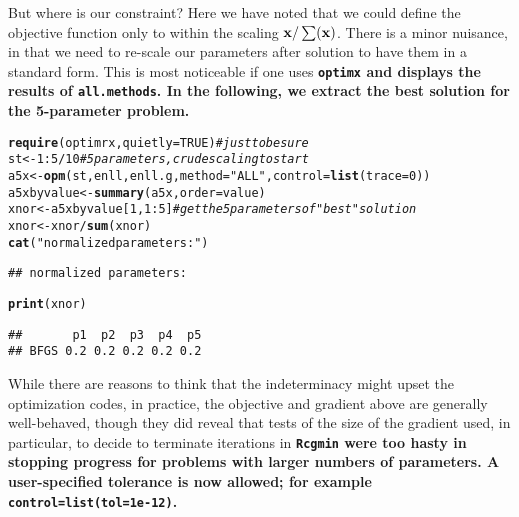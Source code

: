 \documentclass[11pt]{article}\usepackage[]{graphicx}\usepackage[]{color}
\makeatletter
\newcommand{\hlnum}[1]{\textcolor[rgb]{0.686,0.059,0.569}{#1}}%
\newcommand{\hlstr}[1]{\textcolor[rgb]{0.192,0.494,0.8}{#1}}%
\newcommand{\hlcom}[1]{\textcolor[rgb]{0.678,0.584,0.686}{\textit{#1}}}%
\newcommand{\hlopt}[1]{\textcolor[rgb]{0,0,0}{#1}}%
\newcommand{\hlstd}[1]{\textcolor[rgb]{0.345,0.345,0.345}{#1}}%
\newcommand{\hlkwb}[1]{\textcolor[rgb]{0.69,0.353,0.396}{#1}}%
\newcommand{\hlkwc}[1]{\textcolor[rgb]{0.333,0.667,0.333}{#1}}%
\newcommand{\hlkwd}[1]{\textcolor[rgb]{0.737,0.353,0.396}{\textbf{#1}}}%
\newenvironment{kframe}{%
 \def\at@end@of@kframe{}%
 \ifinner\ifhmode%
  \def\at@end@of@kframe{\end{minipage}}%
  \begin{minipage}{\columnwidth}%
 \fi\fi%
 \def\FrameCommand##1{\hskip\@totalleftmargin \hskip-\fboxsep
 \colorbox{shadecolor}{##1}\hskip-\fboxsep
     \hskip-\linewidth \hskip-\@totalleftmargin \hskip\columnwidth}%
 \MakeFramed {\advance\hsize-\width
   \@totalleftmargin\z@ \linewidth\hsize
   \@setminipage}}%
 {\par\unskip\endMakeFramed%
 \at@end@of@kframe}
\newenvironment{knitrout}{}{} %
\newcommand{\B}[1]{{\bf #1 \rm}}
\newcommand{\code}[1]{{\tt#1}}
\newcommand{\pkg}[1]{\bf{\tt#1}\rm }
\makeatother
\begin{document}
But where is our constraint? Here we have noted that we could define the objective 
function only to within the scaling  $\B{x}/\sum(\B{x})$. There is a minor 
nuisance, in that we need to re-scale our 
parameters after solution to have them in a standard form. 
This is most noticeable if one uses \pkg{optimx}
and displays the results of \code{all.methods}. In the following, we
extract the best solution for the 5-parameter problem.

\begin{knitrout}\scriptsize
{}\color{fgcolor}\begin{kframe}
\begin{alltt}
\hlkwd{require}\hlstd{(optimrx,} \hlkwc{quietly}\hlstd{=}\hlnum{TRUE}\hlstd{)} \hlcom{# just to be sure}
\hlstd{st}\hlkwb{<-}\hlnum{1}\hlopt{:}\hlnum{5}\hlopt{/}\hlnum{10} \hlcom{# 5 parameters, crude scaling to start}
\hlstd{a5x}\hlkwb{<-}\hlkwd{opm}\hlstd{(st, enll, enll.g,} \hlkwc{method}\hlstd{=}\hlstr{"ALL"}\hlstd{,} \hlkwc{control}\hlstd{=}\hlkwd{list}\hlstd{(}\hlkwc{trace}\hlstd{=}\hlnum{0}\hlstd{))}
\hlstd{a5xbyvalue}\hlkwb{<-}\hlkwd{summary}\hlstd{(a5x,} \hlkwc{order}\hlstd{=value)}
\hlstd{xnor}\hlkwb{<-}\hlstd{a5xbyvalue[}\hlnum{1}\hlstd{,} \hlnum{1}\hlopt{:}\hlnum{5}\hlstd{]} \hlcom{# get the 5 parameters of "best" solution}
\hlstd{xnor}\hlkwb{<-}\hlstd{xnor}\hlopt{/}\hlkwd{sum}\hlstd{(xnor)}
\hlkwd{cat}\hlstd{(}\hlstr{"normalized parameters:"}\hlstd{)}
\end{alltt}
\begin{verbatim}
## normalized parameters:
\end{verbatim}
\begin{alltt}
\hlkwd{print}\hlstd{(xnor)}
\end{alltt}
\begin{verbatim}
##       p1  p2  p3  p4  p5
## BFGS 0.2 0.2 0.2 0.2 0.2
\end{verbatim}
\end{kframe}
\end{knitrout}


While there are reasons to think that the indeterminacy
might upset the optimization codes, in practice, the objective 
and gradient above are generally
well-behaved, though they did reveal that tests of the size 
of the gradient used, in particular, to
decide to terminate iterations in \pkg{Rcgmin} were too 
hasty in stopping progress for problems
with larger numbers of parameters. A user-specified tolerance is now allowed; for
example \code{control=list(tol=1e-12)}. 
\end{document}
